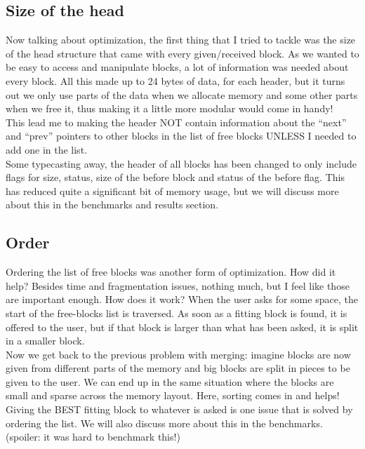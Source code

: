 \documentclass[a4paper,10pt]{article}
\begin{document}
\subsection*{Size of the head}
Now talking about optimization, the first thing that I tried to tackle was the size of the head structure that came with every given/received block. As we wanted to be easy to access and manipulate blocks, a lot of information was needed about every block. All this made up to 24 bytes of data, for each header, but it turns out we only use parts of the data when we allocate memory and some other parts when we free it, thus making it a little more modular would come in handy!\\
\vspace{5mm}
This lead me to making the header NOT contain information about the ``next'' and ``prev'' pointers to other blocks in the list of free blocks UNLESS I needed to add one in the list. \\
Some typecasting away, the header of all blocks has been changed to only include flags for size, status, size of the before block and status of the before flag. This has reduced quite a significant bit of memory usage, but we will discuss more about this in the benchmarks and results section.
\vspace{5mm}
\subsection*{Order}
Ordering the list of free blocks was another form of optimization. How did it help? Besides time and fragmentation issues, nothing much, but I feel like those are important enough. How does it work? When the user asks for some space, the start of the free-blocks list is traversed. As soon as a fitting block is found, it is offered to the user, but if that block is larger than what has been asked, it is split in a smaller block.\\
\vspace{5mm}
Now we get back to the previous problem with merging: imagine blocks are now given from different parts of the memory and big blocks are split in pieces to be given to the user. We can end up in the same situation where the blocks are small and sparse across the memory layout. Here, sorting comes in and helps! Giving the BEST fitting block to whatever is asked is one issue that is solved by ordering the list. We will also discuss more about this in the benchmarks. (spoiler: it was hard to benchmark this!)
\vspace{5mm}
\end{document}
